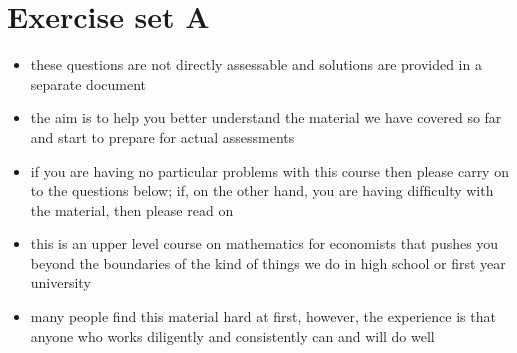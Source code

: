 \documentclass[letterpaper,10pt,english]{jupyterBook}
\begin{document}
\chapter{Exercise set A}
\label{\detokenize{02.exercises:exercise-set-a}}\label{\detokenize{02.exercises::doc}}
\sphinxAtStartPar
{}
\begin{itemize}
\item {} 
\sphinxAtStartPar
these questions are not directly assessable and solutions are provided in a separate document

\item {} 
\sphinxAtStartPar
the aim is to help you better understand the material we have covered so far and start to prepare for actual assessments

\item {} 
\sphinxAtStartPar
if you are having no particular problems with this course then
please carry on to the questions below; if, on the other hand, you are having difﬁculty with the material, then please read on

\item {} 
\sphinxAtStartPar
this is an upper level course on mathematics for economists that pushes you beyond the boundaries of the kind of things we do in high school or ﬁrst year university

\item {} 
\sphinxAtStartPar
many people ﬁnd this material hard at ﬁrst, however, the experience is that anyone who works diligently and consistently can and will do well

\end{itemize}
\end{document}
